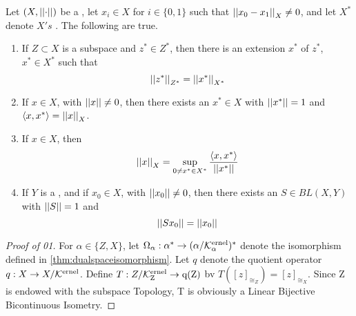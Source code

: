 \label{thm:hahnbanach}
\begin{thm}
Let $(X,\left|\left| \cdot \right|\right|)$ be a \SeminormedSpace,
let $x_i \in X$ for $i \in \{0,1\}$ such that 
$\left|\left| x_0-x_1 \right|\right|_X \neq 0$, and
let $X^*$ denote $X's$
\TopDualSpace. 
The following are true. 
\begin{enumerate}[label=(\roman*), ref={\ref{thm:hahnbanach}~\roman*}]
    \item 
	\label{thm:HahnBanach:Extension1}
	If $Z \subset X$ is a subspace
        and $z^* \in Z^*$, then there 
        is an extension $x^*$ of $z^*$, 
        $x^* \in X^*$ such that 
        \begin{equation}
        \left|\left| z^* \right|\right|_{Z^*} = \left|\left| x^* \right|\right|_{X^*}
        \end{equation}
     \item 
	 \label{thm:HahnBanach:Point1}
	 If $x \in X$, 
        with $\left|\left| x \right|\right| \neq 0$, 
        then there exists an
        $x^* \in X$ with 
        $\left|\left| x^* \right|\right|=1$ and 
        $\left\langle x,x^* \right\rangle = \left|\left| x \right|\right|_X$. 
    \item 
	\label{thm:HahnBanach:Norm}
	If $x \in X$, then 
    \begin{equation}
        \left|\left| x \right|\right|_X = \sup\limits_{0 \neq x^* \in X^*} \frac{\left\langle x,x^* \right\rangle}{\left|\left| x^* \right|\right|}
    \end{equation}
	
    \item 
	\label{thm:HahnBanach:Operator1}
	If $Y$ is a 
        \NonDegenerate
        \SeminormedSpace, and if 
        $x_0 \in X$, with 
        $\left|\left| x_0 \right|\right| \neq 0$, 
        then there exists
        an $S \in BL(X,Y)$ with 
        $\left|\left| S \right|\right| = 1$ and 
        \begin{equation}
            \left|\left| Sx_0 \right|\right| = \left|\left| x_0 \right|\right|
        \end{equation}
\end{enumerate}


\begin{proof}[Proof of 01]
    For $\alpha \in \{Z,X\}$, let 
    $\Omega_\alpha:\alpha^* \to (\alpha/\bf\mathcal{K}\rm^{ernel}_\alpha)^*$ denote the isomorphism
    defined in 
    \ref{thm:dualspaceisomorphism}.
    Let $q$ denote the quotient operator $q:X \to X/\bf\mathcal{K}\rm^{ernel}$. 
    Define $T:Z/\bf\mathcal{K}\rm^{ernel}_Z \to q(Z)$ bv $T([z]_{\cong_Z} ) = [z]_{\cong_X}$. %
    Since Z is endowed with the subspace Topology,                       %
    T is obviously a Linear Bijective Bicontinuous Isometry.          %
    

\end{proof}
\end{thm}
